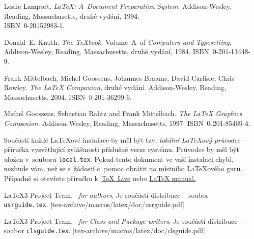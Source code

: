 \raggedright\frenchspacing

\begin{thebibliography}{99}
 Leslie Lamport.  \newblock \emph{{\LaTeX:} A~Document
    Preparation System}.  \newblock Addison-Wesley, Reading,
  Massachusetts, druhé vydání, 1994.\\ISBN~0-201\discretionary{-}{-}{-}52983-1.
  
 Donald~E. Knuth.  \newblock \textit{The \TeX{}book,}
  Volume~A~of \textit{Computers and Typesetting}, Addison-Wesley,
  Reading, Massachusetts, druhé vydání, 1984, ISBN~0-201-13448-9.

 Frank Mittelbach, Michel Goossens, Johannes Braams,
  David Carlisle, Chris Rowley.  \newblock \emph{The {\LaTeX} Companion}, druhé vydání.  \newblock
  Addison-Wesley, Reading, Massachusetts, 2004. ISBN~0-201-36299-6.

 Michel Goossens, Sebastian Rahtz and Frank
  Mittelbach.  \newblock \emph{The {\LaTeX} Graphics Companion}.  \newblock
  Addison-Wesley, Reading, Massachusetts, 1997. ISBN~0-201-85469-4.
 
 Součástí každé \LaTeX ové instalace by měl být tzv.
  \emph{lokální \LaTeX ový průvodce} -- příručka vysvětlující zvláštnosti
  příslušné verze systému. Průvodce by měl být uložen v~souboru 
  \texttt{local.tex}. Pokud tento dokument ve vaší instalaci chybí,
  nezbude vám, než se s~žádostí o~pomoc obrátit na místního
  \LaTeX ového guru. Případně si otevřete příručku k~\href{http://www.tug.org/texlive/doc/texlive-cz/texlive-cz.html}{\TeX~Live} nebo \href{http://www.cstug.cz/latex/lm/frames.html}{\LaTeX{} manual.}
 
 \LaTeX3 Project Team.  \newblock \emph{\LaTeXe~for
    authors}.  \newblock Je součástí distribuce \LaTeXe{}
    -- soubor \verb+usrguide.tex+. \CTANalt|tex-archive/macros/latex/doc/usrguide.pdf|

 \LaTeX3 Project Team.  \newblock \emph{\LaTeXe~for
    Class and Package writers}.  \newblock Je součástí distribuce
    \LaTeXe{} -- soubor \texttt{clsguide.tex}. \CTANalt|tex-archive/macros/latex/doc/clsguide.pdf|


\end{thebibliography}
